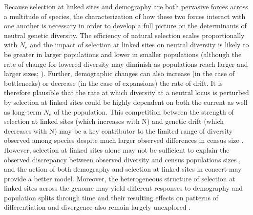 \documentclass[9pt,twocolumn,twoside]{rilabRxiv}
\begin{document}
Because selection at linked sites and demography are both pervasive forces across a multitude of species, the characterization of how these two forces interact with one another is necessary in order to develop a full picture on the determinants of neutral genetic diversity.
The efficiency of natural selection scales proportionally with \textit{$N_e$} and the impact of selection at linked sites on neutral diversity is likely to be greater in larger populations and lower in smaller populations (although the rate of change for lowered diversity may diminish as populations reach larger and larger sizes; \citet{kaplan1989hitchhiking, cutter2013genomic, corbett2015natural, gillespie2001population, santiago2016joint}).
Further, demographic changes can also increase (in the case of bottlenecks) or decrease (in the case of expansions) the rate of drift.
It is therefore plausible that the rate at which diversity at a neutral locus is perturbed by selection at linked sites could be highly dependent on both the current as well as long-term $N_e$ of the population.
This competition between the strength of selection at linked sites (which increases with N) and genetic drift (which decreases with N) may be a key contributor to the limited range of diversity observed among species  despite much larger observed differences in census size \citep{gillespie2001population, corbett2015natural, santiago2016joint}.
However, selection at linked sites alone may not be sufficient to explain the observed discrepancy between observed diversity and census populations sizes \citep{coop2016does}, and the action of both demography and selection at linked sites in concert may provide a better model. 
Moreover, the heterogeneous structure of selection at linked sites across the genome may yield different responses to demography and population splits through time and their resulting effects on patterns of differentiation and divergence also remain largely unexplored \citep{burri2017interpreting}.
\end{document}
